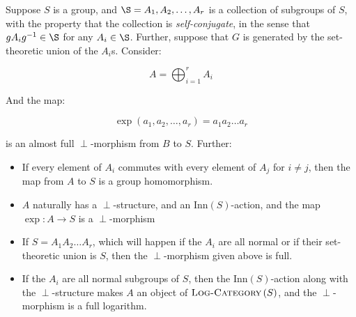 \documentclass[a4paper]{amsart}
\newcommand{\logcategory}[1]{\textsc{Log-Category}\left(#1\right)}
\newcommand{\inn}[1]{\text{Inn}\left(#1\right)}
\begin{document}
\begin{theorem}
  Suppose $S$ is a group, and $\S = A_1, A_2, \ldots, A_r$ is a
  collection of subgroups of $S$, with the property that the
  collection is {\em self-conjugate}, in the sense that $gA_ig^{-1}
  \in \S$ for any $A_i \in \S$. Further, suppose that $G$ is generated
  by the set-theoretic union of the $A_i$s. Consider:

  $$A = \bigoplus_{i=1}^r A_i$$

  And the map:

  $$\exp(a_1,a_2,\ldots,a_r) = a_1a_2\ldots a_r$$

  is an almost full $\perp$-morphism from $B$ to $S$. Further:

  \begin{itemize}

  \item If every element of $A_i$ commutes with every element of $A_j$
    for $i \ne j$, then the map from $A$ to $S$ is a group homomorphism.

  \item $A$ naturally has a $\perp$-structure, and an
    $\inn{S}$-action, and the map $\exp:A \to S$ is a $\perp$-morphism
  \item If $S = A_1A_2\ldots A_r$, which will happen if the $A_i$ are
    all normal or if their set-theoretic union is $S$, then the
    $\perp$-morphism given above is full.

  \item If the $A_i$ are all normal subgroups of $S$, then the
    $\inn{S}$-action along with the $\perp$-structure makes $A$ an
    object of $\logcategory{S}$, and the $\perp$-morphism is a full
    logarithm.

  \end{itemize}
\end{theorem}
\end{document}

